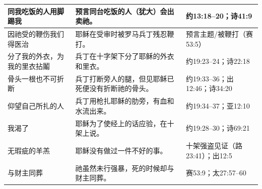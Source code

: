 \begin{table}[htbp]
\begin{tabular}{|p{3.3cm}|p{4.5cm}|p{4.6cm}|}
同我吃饭的人用脚踢我 & 预言同台吃饭的人（犹大）会出卖祂。 & 约13:18--20；诗41:9 \\\hline

因祂受的鞭伤我们得医治 & 耶稣在受审时被罗马兵丁残忍鞭打。 & 预言主题/被鞭打（赛53:5） \\\hline

分了我的外衣，为我的里衣拈鬮 & 兵丁在十字架下分了耶稣的外衣和里衣。 & 约19:23--24；诗22:18 \\\hline

骨头一根也不可折断 & 兵丁打断旁人的腿，但见耶稣已死便没有折断祂的骨头。 & 约19:33--36；出12:46；诗34:20 \\\hline

仰望自己所扎的人 & 兵丁用枪扎耶稣的肋旁，有血和水流出来。 & 约19:34--37；亚12:10 \\\hline

我渴了 & 耶稣为了使经上的话应验，在十架上说。 & 约19:28--30；诗69:21 \\\hline

无瑕疵的羊羔 & 耶稣没有做过一件不好的事。 & 十架强盗见证（路23:41）；出12:5 \\\hline

与财主同葬 & 祂虽然未行强暴，死的时候却与财主同葬。 & 赛53:9；太27:57--60 \\\hline

\end{tabular}
\end{table}










